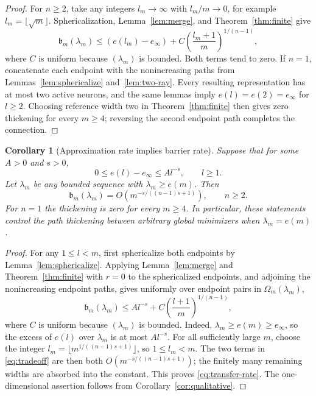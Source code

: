 \documentclass[pdflatex,sn-mathphys-num]{sn-jnl}
\theoremstyle{thmstyleone}
\newtheorem{corollary}[theorem]{Corollary}
\theoremstyle{thmstyletwo}
\theoremstyle{thmstylethree}
\newcommand{\SubBar}{\mathfrak b}
\begin{document}
\begin{proof}
For $n\ge2$, take any integers $l_m\to\infty$ with $l_m/m\to0$, for example $l_m=\lfloor\sqrt m\rfloor$. Sphericalization, Lemma~\ref{lem:merge}, and Theorem~\ref{thm:finite} give
\[
\SubBar_m(\lambda_m)
\le (e(l_m)-e_\infty)
+C\left(\frac{l_m+1}{m}\right)^{1/(n-1)},
\]
where $C$ is uniform because $(\lambda_m)$ is bounded. Both terms tend to zero. If $n=1$, concatenate each endpoint with the nonincreasing paths from Lemmas~\ref{lem:sphericalize} and~\ref{lem:two-ray}. Every resulting representation has at most two active neurons, and the same lemmas imply $e(l)=e(2)=e_\infty$ for $l\ge2$. Choosing reference width two in Theorem~\ref{thm:finite} then gives zero thickening for every $m\ge4$; reversing the second endpoint path completes the connection.
\end{proof}

\begin{corollary}[Approximation rate implies barrier rate]\label{cor:transfer}
Suppose that for some $A>0$ and $s>0$,
\begin{equation}
0\le e(l)-e_\infty\le A l^{-s},
\qquad l\ge1.
\label{eq:approx-rate}
\end{equation}
Let $\lambda_m$ be any bounded sequence with $\lambda_m\ge e(m)$. Then
\begin{equation}
\SubBar_m(\lambda_m)
=O\!\left(m^{-s/((n-1)s+1)}\right),
\qquad n\ge2.
\label{eq:transfer-rate}
\end{equation}
For $n=1$ the thickening is zero for every $m\ge4$. In particular, these statements control the path thickening between arbitrary global minimizers when $\lambda_m=e(m)$.
\end{corollary}

\begin{proof}
For any $1\le l<m$, first sphericalize both endpoints by Lemma~\ref{lem:sphericalize}. Applying Lemma~\ref{lem:merge} and Theorem~\ref{thm:finite} with $r=0$ to the sphericalized endpoints, and adjoining the nonincreasing endpoint paths, gives uniformly over endpoint pairs in $\Omega_m(\lambda_m)$,
\begin{equation}
\SubBar_m(\lambda_m)
\le
A l^{-s}+C\left(\frac{l+1}{m}\right)^{1/(n-1)},
\label{eq:tradeoff}
\end{equation}
where $C$ is uniform because $(\lambda_m)$ is bounded. Indeed, $\lambda_m\ge e(m)\ge e_\infty$, so the excess of $e(l)$ over $\lambda_m$ is at most $A l^{-s}$. For all sufficiently large $m$, choose the integer
$l_m=\lfloor m^{1/((n-1)s+1)}\rfloor$, so $1\le l_m<m$. The two terms in \eqref{eq:tradeoff} are then both $O(m^{-s/((n-1)s+1)})$; the finitely many remaining widths are absorbed into the constant. This proves \eqref{eq:transfer-rate}. The one-dimensional assertion follows from Corollary~\ref{cor:qualitative}.
\end{proof}
\end{document}
